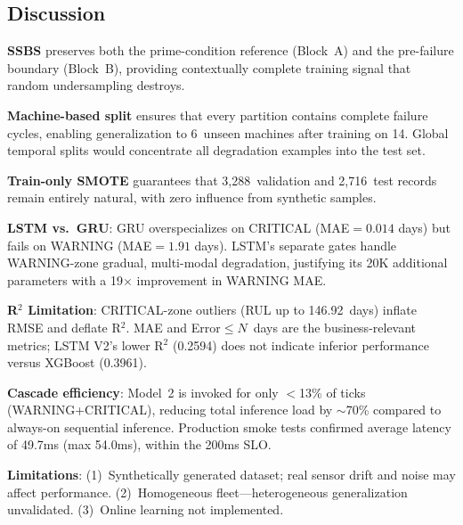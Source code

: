 \documentclass[conference]{IEEEtran}
\begin{document}

\subsection{Discussion}

\textbf{SSBS} preserves both the prime-condition reference (Block~A) and the
pre-failure boundary (Block~B), providing contextually complete training
signal that random undersampling destroys.

\textbf{Machine-based split} ensures that every partition contains complete
failure cycles, enabling generalization to 6~unseen machines after training
on 14. Global temporal splits would concentrate all degradation examples into
the test set.

\textbf{Train-only SMOTE} guarantees that 3,288~validation and 2,716~test
records remain entirely natural, with zero influence from synthetic samples.

\textbf{LSTM vs.\ GRU}: GRU overspecializes on CRITICAL (MAE$=0.014$ days)
but fails on WARNING (MAE$=1.91$ days). LSTM's separate gates handle
WARNING-zone gradual, multi-modal degradation, justifying its 20K additional
parameters with a 19$\times$ improvement in WARNING MAE.

\textbf{R$^2$ Limitation}: CRITICAL-zone outliers (RUL up to 146.92~days)
inflate RMSE and deflate R$^2$. MAE and Error$\leq N$~days are the
business-relevant metrics; LSTM V2's lower R$^2$ (0.2594) does not indicate
inferior performance versus XGBoost (0.3961).

\textbf{Cascade efficiency}: Model~2 is invoked for only $<$13\% of ticks
(WARNING+CRITICAL), reducing total inference load by $\sim$70\% compared to
always-on sequential inference. Production smoke tests confirmed average
latency of 49.7ms (max 54.0ms), within the 200ms SLO.

\textbf{Limitations}: (1)~Synthetically generated dataset; real sensor drift
and noise may affect performance. (2)~Homogeneous fleet---heterogeneous
generalization unvalidated. (3)~Online learning not implemented.
\end{document}
